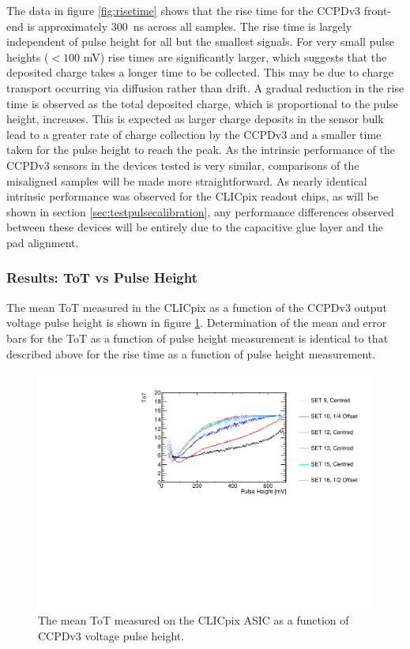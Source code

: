 The data in figure \ref{fig:risetime} shows that the rise time for the CCPDv3 front-end is approximately 300~ns across all samples.  The rise time is largely independent of pulse height for all but the smallest signals.  For very small pulse heights ($< 100$ mV) rise times are significantly larger, which suggests that the deposited charge takes a longer time to be collected.  This may be due to charge transport occurring via diffusion rather than drift.  A gradual reduction in the rise time is observed as the total deposited charge, which is proportional to the pulse height, increases.  This is expected as larger charge deposits in the sensor bulk lead to a greater rate of charge collection by the CCPDv3 and a smaller time taken for the pulse height to reach the peak.  As the intrinsic performance of the CCPDv3 sensors in the devices tested is very similar, comparisons of the misaligned samples will be made more straightforward.  As nearly identical intrinsic performance was observed for the CLICpix readout chips, as will be shown in section \ref{sec:testpulsecalibration}, any performance differences observed between these devices will be entirely due to the capacitive glue layer and the pad alignment.    


\subsubsection{Results: ToT vs Pulse Height}
\label{sec:resultstotpulseheight}
The mean ToT measured in the CLICpix as a function of the CCPDv3 output voltage pulse height is shown in figure \ref{fig:tot}.  Determination of the mean and error bars for the ToT as a function of pulse height measurement is identical to that described above for the rise time as a function of pulse height measurement.   

\begin{figure}[h!]
\centering
\includegraphics[width=1.0\textwidth]{CLICdpVertex/Plots/RadSourceAnalysis/AllSETs_TargetTot_PulseHeight.pdf}
\caption[The mean ToT measured on the CLICpix ASIC as a function of CCPDv3 voltage pulse height.]{The mean ToT measured on the CLICpix ASIC as a function of CCPDv3 voltage pulse height.}
\label{fig:tot}
\end{figure}

